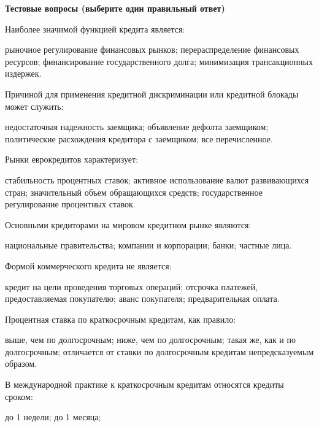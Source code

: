 \documentclass[12pt, table]{exam}
\begin{document}
\pagebreak
\noindent\textbf{Тестовые вопросы (выберите один правильный ответ)}

\begin{questions}
\begin{multicols}{2}
\setlength{\columnsep}{1cm}

\question Наиболее значимой функцией кредита является:
	 \begin{choices}
	 \CC рыночное регулирование финансовых рынков;
	 \choice перераспределение финансовых ресурсов;
	 \choice финансирование государственного долга;
	 \choice минимизация трансакционных издержек.
	 \end{choices}
\question Причиной для применения кредитной дискриминации или кредитной блокады может служить:
	 \begin{choices}
	 \CC недостаточная надежность заемщика;
	 \choice объявление дефолта заемщиком;
	 \choice политические расхождения кредитора с заемщиком;
	 \choice все перечисленное.
	 \end{choices}
\question Рынки еврокредитов характеризует:
	 \begin{choices}
	 \choice стабильность процентных ставок;
	 \choice активное использование валют развивающихся стран;
	 \choice значительный объем обращающихся средств;
	 \CC государственное регулирование процентных ставок.
	 \end{choices}
\question Основными кредиторами на мировом кредитном рынке являются:
	 \begin{choices}
	 \choice национальные правительства;
	 \CC компании и корпорации;
	 \choice банки;
	 \choice частные лица.
	 \end{choices}
\question Формой коммерческого кредита не является:
	 \begin{choices}
	 \CC кредит на цели проведения торговых операций;
	 \choice отсрочка платежей, предоставляемая покупателю;
	 \choice аванс покупателя;
	 \choice предварительная оплата.
	 \end{choices}
\question Процентная ставка по краткосрочным кредитам, как правило:
	 \begin{choices}
	 \choice выше, чем по долгосрочным;
	 \choice ниже, чем по долгосрочным;
	 \choice такая же, как и по долгосрочным;
	 \CC отличается от ставки по долгосрочным кредитам непредсказуемым образом.
	 \end{choices}
\question В международной практике к краткосрочным кредитам относятся кредиты сроком:
	 \begin{choices}
	 \CC до 1 недели;
	 \choice до 1 месяца;

\end{choices}
\end{multicols}
\end{questions}
\end{document}
